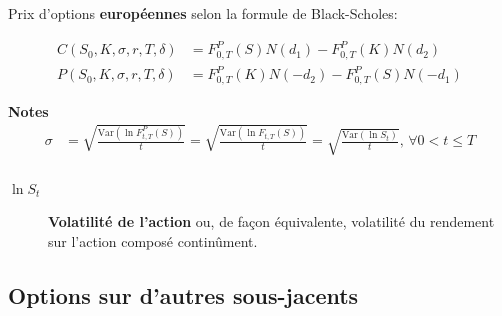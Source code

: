 \documentclass[10pt, french]{article}
\begin{document}
\begin{multicols*}{2}
\begin{definitionNOHFILL}
Prix d'options \textbf{européennes} selon la formule de Black-Scholes:

\begin{align*}
	C(S_{0}, K, \sigma, r, T, \delta)
	&=	F^{P}_{0, T}(S) N(d_{1}) - F^{P}_{0, T}(K) N(d_{2})	\\
	P(S_{0}, K, \sigma, r, T, \delta)
	&=	F^{P}_{0, T}(K) N(-d_{2}) - F^{P}_{0, T}(S) N(-d_{1})	
\end{align*}

\tcbline
\textbf{Notes}
\begin{align*}
	\sigma
	&=	\sqrt{\frac{\text{Var}(\ln F^{P}_{t, T}(S))}{t}}	
	=	\sqrt{\frac{\text{Var}(\ln F_{t, T}(S))}{t}}	
	=	\sqrt{\frac{\text{Var}(\ln S_{t})}{t}}, \, \forall 0 < t \le T	\\
\end{align*}

\begin{description}
	\item[$\ln S_{t}$]	\textbf{Volatilité de l'action} ou, de façon équivalente, volatilité du rendement sur l'action composé continûment.
\end{description}
\end{definitionNOHFILL}


\subsection{Options sur d'autres sous-jacents}


\end{multicols*}
\end{document}
